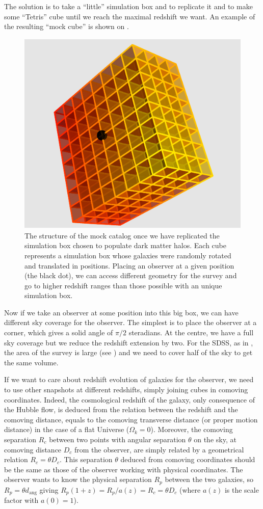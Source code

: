 The solution is to take a ``little'' simulation box and to replicate it and to
make some ``Tetris'' cube until we reach the maximal redshift we want. An
example of the resulting ``mock cube'' is shown on .
%
\begin{figure}[htb]
    \centering
    \includegraphics[width=0.5\linewidth]{figures/mock/mock}
    \caption{The structure of the mock catalog once we have replicated the
        simulation box chosen to populate dark matter halos. Each cube
        represents a simulation box whose galaxies were randomly rotated and
        translated in positions. Placing an observer at a given position (the
    black dot), we can access different geometry for the survey and go to
higher redshift ranges than those possible with an unique simulation
box.\label{fig:cubemock}}%
\end{figure}

Now if we take an observer at some position into this big box, we can have
different sky coverage for the observer. The simplest is to place the observer
at a corner, which gives a solid angle of $\pi/2$ steradians. At the centre,
we have a full sky coverage but we reduce the redshift extension by two. For
the SDSS, as in , the area of the survey is large (see
) and we need to cover half of the sky to get the same
volume.

If we want to care about redshift evolution of galaxies for the observer, we
need to use other snapshots at different redshifts, simply joining cubes in
comoving coordinates. Indeed, the cosmological redshift of the galaxy, only
consequence of the Hubble flow, is deduced from the relation between the
redshift and the comoving distance, equals to the comoving transverse distance
(or proper motion distance) in the case of a flat Universe ($\Omega_k=0$).
Moreover, the comoving separation $R_c$ between two points with angular
separation $\theta$ on the sky, at comoving distance $D_c$ from the observer,
are simply related by a geometrical relation $R_c=\theta D_c$. This separation
$\theta$ deduced from comoving coordinates should be the same as those of the
observer working with physical coordinates. The observer wants to know the
physical separation $R_p$ between the two galaxies, so $R_p=\theta
d_\mathrm{ang}$ giving $R_p \left(1+z\right)= R_p/a\left(z\right)=R_c=\theta
D_c$ (where $a \left(z\right)$ is the scale factor with $a \left(0\right)=1$).

